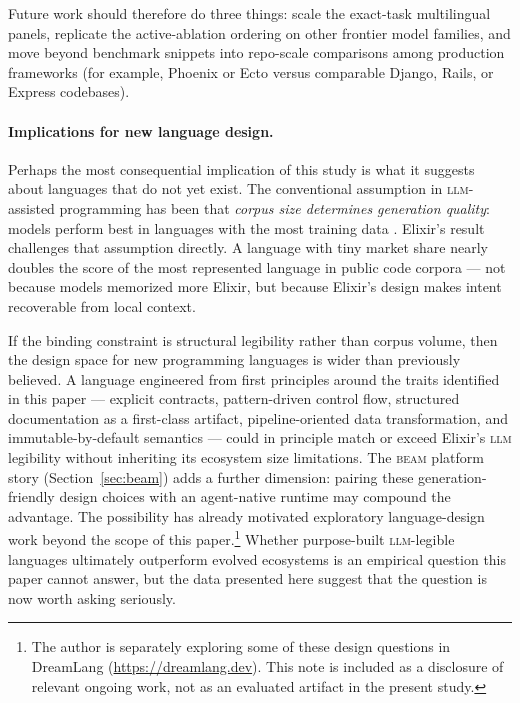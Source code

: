 \documentclass[11pt]{article}
\newcommand{\elixir}{Elixir}
\newcommand{\acro}[1]{\textsc{\MakeLowercase{#1}}}
\begin{document}
Future work should therefore do three things: scale the exact-task multilingual panels, replicate the active-ablation ordering on other frontier model families, and move beyond benchmark snippets into repo-scale comparisons among production frameworks (for example, Phoenix or Ecto versus comparable Django, Rails, or Express codebases).

\paragraph{Implications for new language design.}
Perhaps the most consequential implication of this study is what it suggests about languages that do not yet exist. The conventional assumption in \acro{LLM}-assisted programming has been that \emph{corpus size determines generation quality}: models perform best in languages with the most training data \cite{lowresource}. \elixir{}'s result challenges that assumption directly. A language with tiny market share nearly doubles the score of the most represented language in public code corpora --- not because models memorized more \elixir{}, but because \elixir{}'s design makes intent recoverable from local context.

If the binding constraint is structural legibility rather than corpus volume, then the design space for new programming languages is wider than previously believed. A language engineered from first principles around the traits identified in this paper --- explicit contracts, pattern-driven control flow, structured documentation as a first-class artifact, pipeline-oriented data transformation, and immutable-by-default semantics --- could in principle match or exceed \elixir{}'s \acro{LLM} legibility without inheriting its ecosystem size limitations. The \acro{BEAM} platform story (Section~\ref{sec:beam}) adds a further dimension: pairing these generation-friendly design choices with an agent-native runtime may compound the advantage.
The possibility has already motivated exploratory language-design work beyond the scope of this paper.\footnote{The author is separately exploring some of these design questions in DreamLang (\url{https://dreamlang.dev}). This note is included as a disclosure of relevant ongoing work, not as an evaluated artifact in the present study.} Whether purpose-built \acro{LLM}-legible languages ultimately outperform evolved ecosystems is an empirical question this paper cannot answer, but the data presented here suggest that the question is now worth asking seriously.
\end{document}
